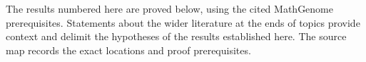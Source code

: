 \documentclass[11pt,oneside,openany]{book}
\theoremstyle{definition}
\theoremstyle{remark}
\begin{document}
The results numbered here are proved below, using the cited MathGenome
prerequisites. Statements about the wider literature at the ends of topics
provide context and delimit the hypotheses of the results established here.
The source map records the exact locations and proof prerequisites.

\mainmatter







\appendix

\backmatter

\end{document}
